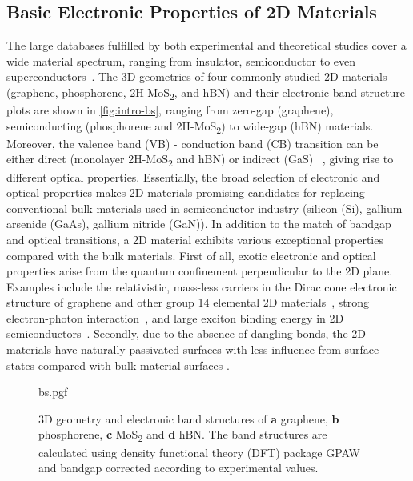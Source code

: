 \subsection{Basic Electronic Properties of 2D Materials}
\label{sec:basic-electr-prop}

The large databases fulfilled  by both
experimental and theoretical studies cover a wide material spectrum,
ranging from insulator, semiconductor to even
superconductors~\cite{Novoselov_2016_vdW}.
%
The 3D geometries of four commonly-studied 2D materials (graphene,
phosphorene, 2H-MoS\textsubscript{2}, and hBN) and their electronic
band structure plots are shown in \autoref{fig:intro-bs}, ranging from
zero-gap (graphene), semiconducting (phosphorene and
2H-MoS\textsubscript{2}) to wide-gap (hBN) materials.
%
Moreover, the valence band (VB) - conduction band (CB) transition can
be either direct (monolayer 2H-MoS\textsubscript{2} and hBN) or
indirect (GaS) ~\cite{Xia_2014}, giving rise to different
optical properties.
%
Essentially, the broad selection of electronic and optical properties
makes 2D materials promising candidates for replacing conventional
bulk materials used in semiconductor industry (\eg silicon (Si),
gallium arsenide (GaAs), gallium nitride (GaN)).
%
In addition to the match of bandgap and optical transitions, a 2D
material exhibits various exceptional properties compared with the bulk materials.
%
First of all, exotic electronic and optical properties arise from the
quantum confinement perpendicular to the 2D
plane.
%
Examples include the relativistic, mass-less carriers in the Dirac
cone electronic structure of graphene and other group 14 elemental 2D
materials~\cite{Novoselov_2005_massless,Zhang_2005_QHE,Das_sarma_2011_gr_electr},
strong electron-photon
interaction~\nocite{Nair_2008_transparent,Eda_2013_rev_opt}, and large
exciton binding energy in 2D
semiconductors~\cite{Mak_2010_mos2,Arnaud_2006_exc_hBN}.
%
Secondly, due to the absence of dangling bonds, the 2D materials have
naturally passivated surfaces with less influence from surface states
compared with bulk material surfaces
\cite{Novoselov_2016_vdW,Liu_2016_rev}.


\begin{figure}[htbp]
  \centering
  {bs.pgf}
  \caption{\label{fig:intro-bs} %
    3D geometry and electronic band structures of \textbf{a} graphene,
    \textbf{b} phosphorene, \textbf{c} MoS\textsubscript{2} and
    \textbf{d} hBN. The band structures are calculated using density
    functional theory (DFT) package GPAW~\cite{Mortensen_2005_gpaw}
    and bandgap corrected according to experimental values.}
\end{figure}


